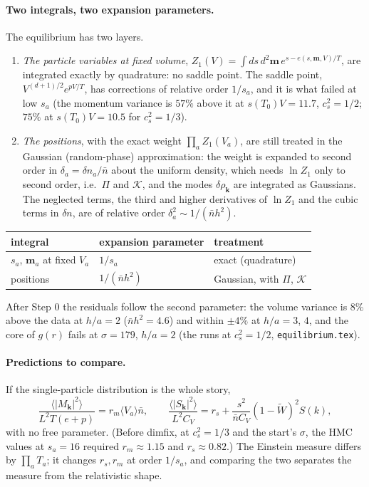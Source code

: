 \documentclass[11pt,aps,preprint,nofootinbib,superscriptaddress,tightenlines]{revtex4-2}
\newcommand{\avg}[1]{\langle #1\rangle}
\def\st{\begin{equation}}
\def\stp{\end{equation}}
\let\oldparagraph\paragraph
\renewcommand{\paragraph}{\par\bigskip\oldparagraph}
\begin{document}
\paragraph{Two integrals, two expansion parameters.}  The equilibrium has two layers.
\begin{enumerate}
\item \emph{The particle variables at fixed volume}, $Z_1(V)=\int ds\,d^2\bm m\,e^{s-e(s,\bm m,V)/T}$, are integrated exactly by quadrature: no saddle point.  The saddle point,
  $V^{(d+1)/2}e^{pV/T}$, has corrections of relative order $1/s_a$, and it is what failed at low $s_a$ (the momentum variance is $57\%$ above it at $s(T_0)V=11.7$, $c_s^2=1/2$; $75\%$ at $s(T_0)V=10.5$ for $c_s^2=1/3$).
\item \emph{The positions}, with the exact weight $\prod_aZ_1(V_a)$, are still treated in the Gaussian (random-phase) approximation: the weight is expanded to
  second order in $\delta_a=\delta n_a/\bar n$ about the uniform density, which needs $\ln Z_1$ only to second order, i.e.\ $\Pi$ and $\mathcal K$, and the modes $\delta\rho_{\bm k}$ are
  integrated as Gaussians.  The neglected terms, the third and higher derivatives of $\ln Z_1$ and the cubic terms in $\delta n$, are of relative order
  $\delta_a^2\sim1/(\bar nh^2)$.
\end{enumerate}
\begin{center}
\begin{tabular}{lll}
\toprule
integral & expansion parameter & treatment \\
\midrule
$s_a$, $\bm m_a$ at fixed $V_a$ & $1/s_a$ & exact (quadrature) \\
positions & $1/(\bar nh^2)$ & Gaussian, with $\Pi$, $\mathcal K$ \\
\bottomrule
\end{tabular}
\end{center}
After Step 0 the residuals follow the second parameter: the volume variance is $8\%$ above the data at $h/a=2$ ($\bar nh^2=4.6$) and within $\pm4\%$ at
$h/a=3$, $4$, and the core of $g(r)$ fails at $\sigma=179$, $h/a=2$ (the runs at $c_s^2=1/2$, \texttt{equilibrium.tex}).

\paragraph{Predictions to compare.}  If the single-particle distribution is the whole story,
\st
\frac{\avg{|M_{\bm k}|^2}}{L^2T(e+p)}=r_m\avg{V_a}\bar n,\qquad
\frac{\avg{|S_{\bm k}|^2}}{L^2C_V}=r_s+\frac{s^2}{\bar nC_V}(1-\widetilde W)^2S(k),
\stp
with no free parameter.  (Before dimfix, at $c_s^2=1/3$ and the start's $\sigma$, the HMC values at $s_a=16$ required $r_m\approx1.15$ and $r_s\approx0.82$.)  The Einstein measure differs by $\prod_aT_a$;
it changes $r_s,r_m$ at order $1/s_a$, and comparing the two separates the measure from the relativistic shape.
\end{document}
